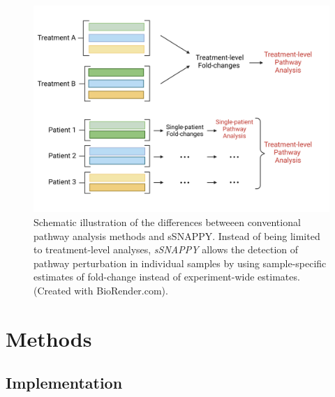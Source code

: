 \documentclass[9pt,a4paper,]{extarticle}
\begin{document}
\begin{figure}

{\centering \includegraphics[width=1\linewidth]{sSNAPPY_paper_files/figure-latex/Figure1} 

}

\caption{Schematic illustration of the differences betweeen conventional pathway analysis methods and sSNAPPY. Instead of being limited to treatment-level analyses, \textit{sSNAPPY} allows the detection of pathway perturbation in individual samples by using sample-specific estimates of fold-change instead of experiment-wide estimates. (Created with BioRender.com).}\label{fig:Figure1}
\end{figure}

\hypertarget{methods}{%
\section{Methods}\label{methods}}

\hypertarget{implementation}{%
\subsection{Implementation}\label{implementation}}
\end{document}
